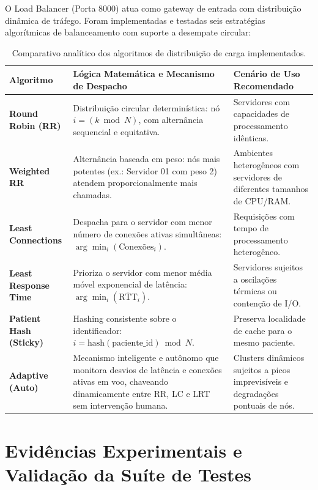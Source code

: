 \documentclass[11pt,a4paper]{article}
\begin{document}
O Load Balancer (Porta 8000) atua como gateway de entrada com distribuição dinâmica de tráfego. Foram implementadas e testadas seis estratégias algorítmicas de balanceamento com suporte a desempate circular:

\begin{table}[H]
\centering
\small
\begin{tabularx}{\linewidth}{p{3.2cm} X p{4.6cm}}
\toprule
\textbf{Algoritmo} & \textbf{Lógica Matemática e Mecanismo de Despacho} & \textbf{Cenário de Uso Recomendado} \\
\midrule
\textbf{Round Robin (RR)} & Distribuição circular determinística: nó $i = (k \bmod N)$, com alternância sequencial e equitativa. & Servidores com capacidades de processamento idênticas. \\
\addlinespace
\textbf{Weighted RR} & Alternância baseada em peso: nós mais potentes (ex.: Servidor 01 com peso 2) atendem proporcionalmente mais chamadas. & Ambientes heterogêneos com servidores de diferentes tamanhos de CPU/RAM. \\
\addlinespace
\textbf{Least Connections} & Despacha para o servidor com menor número de conexões ativas simultâneas: $\arg\min_{i} (\text{Conexões}_{i})$. & Requisições com tempo de processamento heterogêneo. \\
\addlinespace
\textbf{Least Response Time} & Prioriza o servidor com menor média móvel exponencial de latência: $\arg\min_{i} (\overline{\text{RTT}}_{i})$. & Servidores sujeitos a oscilações térmicas ou contenção de I/O. \\
\addlinespace
\textbf{Patient Hash (Sticky)} & Hashing consistente sobre o identificador: $i = \text{hash}(\text{paciente\_id}) \bmod N$. & Preserva localidade de cache para o mesmo paciente. \\
\addlinespace
\textbf{Adaptive (Auto)} & Mecanismo inteligente e autônomo que monitora desvios de latência e conexões ativas em voo, chaveando dinamicamente entre RR, LC e LRT sem intervenção humana. & Clusters dinâmicos sujeitos a picos imprevisíveis e degradações pontuais de nós. \\
\bottomrule
\end{tabularx}
\caption{Comparativo analítico dos algoritmos de distribuição de carga implementados.}
\end{table}

\section{Evidências Experimentais e Validação da Suíte de Testes}
\end{document}
